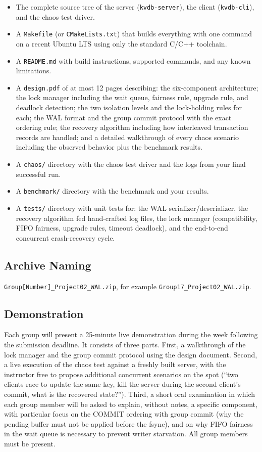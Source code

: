 \documentclass[11pt,a4paper]{article}
\begin{document}
\begin{itemize}
\item The complete source tree of the server (\texttt{kvdb-server}), the client (\texttt{kvdb-cli}), and the chaos test driver.
\item A \texttt{Makefile} (or \texttt{CMakeLists.txt}) that builds everything with one command on a recent Ubuntu LTS using only the standard C/C++ toolchain.
\item A \texttt{README.md} with build instructions, supported commands, and any known limitations.
\item A \texttt{design.pdf} of at most 12 pages describing: the six-component architecture; the lock manager including the wait queue, fairness rule, upgrade rule, and deadlock detection; the two isolation levels and the lock-holding rules for each; the WAL format and the group commit protocol with the exact ordering rule; the recovery algorithm including how interleaved transaction records are handled; and a detailed walkthrough of every chaos scenario including the observed behavior plus the benchmark results.
\item A \texttt{chaos/} directory with the chaos test driver and the logs from your final successful run.
\item A \texttt{benchmark/} directory with the benchmark and your results.
\item A \texttt{tests/} directory with unit tests for: the WAL serializer/deserializer, the recovery algorithm fed hand-crafted log files, the lock manager (compatibility, FIFO fairness, upgrade rules, timeout deadlock), and the end-to-end concurrent crash-recovery cycle.
\end{itemize}

\subsection{Archive Naming}
\texttt{Group[Number]\_Project02\_WAL.zip}, for example \texttt{Group17\_Project02\_WAL.zip}.

\subsection{Demonstration}
Each group will present a 25-minute live demonstration during the week following the submission deadline. It consists of three parts. First, a walkthrough of the lock manager and the group commit protocol using the design document. Second, a live execution of the chaos test against a freshly built server, with the instructor free to propose additional concurrent scenarios on the spot (``two clients race to update the same key, kill the server during the second client's commit, what is the recovered state?''). Third, a short oral examination in which each group member will be asked to explain, without notes, a specific component, with particular focus on the COMMIT ordering with group commit (why the pending buffer must not be applied before the fsync), and on why FIFO fairness in the wait queue is necessary to prevent writer starvation. All group members must be present.
\end{document}
